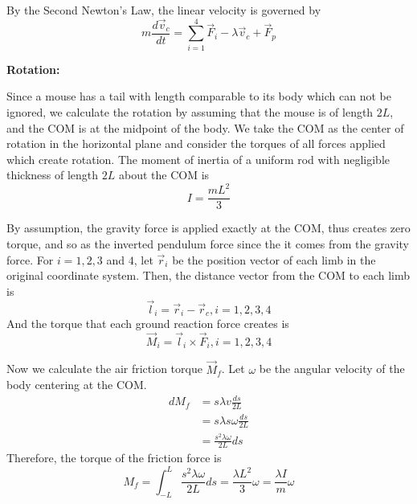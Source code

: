 \documentclass[11pt]{article}
\begin{document}
By the Second Newton's Law, the linear velocity is governed by
\begin{equation}\label{eq:accelerationeq}
	m\frac{d \vec{v}_c}{dt} = \sum_{i=1}^4 \vec{F}_i - \lambda \vec{v}_c + \vec{F}_{p}
\end{equation}



\noindent\textbf{Rotation:} 

Since a mouse has a tail with length comparable to its body which can not be ignored, we calculate the rotation by assuming that the mouse is of length $ 2L $, and the COM is at the midpoint of the body. We take the COM as the center of rotation in the horizontal plane and consider the torques of all forces applied which create rotation. The moment of inertia of a uniform rod with negligible thickness of length $ 2L $ about the COM is
\begin{equation}
	I = \frac{mL^2}{3}
\end{equation}

By assumption, the gravity force is applied exactly at the COM, thus creates zero torque, and so as the inverted pendulum force since the it comes from the gravity force. For $ i=1,2,3$ and $ 4 $, let $ \vec{r}_i $ be the position vector of each limb in the original coordinate system. Then, the distance vector from the COM to each limb is 
\begin{equation}
	\vec{l}_i = \vec{r}_i-\vec{r}_c, i = 1,2,3,4
\end{equation}
And the torque that each ground reaction force creates is
\begin{equation}
	\vec{M}_i = \vec{l}_i \times \vec{F}_i, i = 1,2,3,4
\end{equation}

Now we calculate the air friction torque $ \vec{M}_f $.
Let $ \omega $ be the angular velocity of the body centering at the COM.
\begin{align*}
	dM_f &= s\lambda v \frac{ds}{2L}\\
	&= s\lambda s\omega \frac{ds}{2L}\\
	&= \frac{s^2\lambda \omega}{2L} ds
\end{align*}
Therefore, the torque of the friction force is 
\begin{equation}
	M_f = \int_{-L}^{L} \frac{s^2\lambda \omega}{2L} ds =  \frac{\lambda L^2}{3} \omega = \frac{\lambda I}{m} \omega 
\end{equation}
\end{document}
